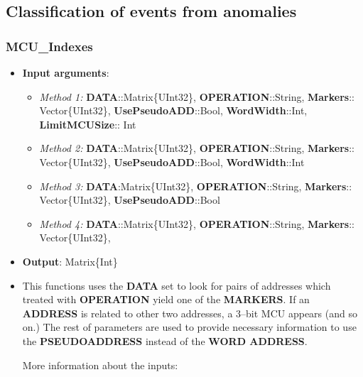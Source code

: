  \subsection{Classification of events from anomalies}\label{SubSec:ClassificationEventsFromAnomalies}
 \subsubsection*{MCU\_Indexes}
 \begin{itemize}
 	\item \textbf{Input arguments}: 
 		\begin{itemize}
 			\item \textit{Method 1: } \textbf{DATA}::Matrix\{UInt32\}, 
 			\textbf{OPERATION}::String,
 			\textbf{Markers}:: Vector\{UInt32\}, 
 			\textbf{UsePseudoADD}::Bool, 
 			\textbf{WordWidth}::Int,
 			\textbf{LimitMCUSize}:: Int
 			\item \textit{Method 2: } \textbf{DATA}::Matrix\{UInt32\}, 
 			\textbf{OPERATION}::String,
 			\textbf{Markers}:: Vector\{UInt32\}, 
 			\textbf{UsePseudoADD}::Bool, 
 			\textbf{WordWidth}::Int
 			\item \textit{Method 3: } \textbf{DATA}:Matrix\{UInt32\}, 
 			\textbf{OPERATION}::String,
 			\textbf{Markers}:: Vector\{UInt32\}, 
 			\textbf{UsePseudoADD}::Bool
 			\item \textit{Method 4: } \textbf{DATA}::Matrix\{UInt32\}, 
 			\textbf{OPERATION}::String,
 			\textbf{Markers}:: Vector\{UInt32\}, 
 		\end{itemize}
 	\item \textbf{Output}: Matrix\{Int\}
 	\item This functions uses the \textbf{DATA} set to look for pairs of addresses which treated with 	 \textbf{OPERATION} yield one of the \textbf{MARKERS}. If an \textbf{ADDRESS} is related to other two addresses, 	 a 3--bit MCU appears (and so on.) The rest of parameters are used to provide necessary  information to use the \textbf{PSEUDOADDRESS} instead of the \textbf{WORD ADDRESS}. 
	 
	 More information about the inputs:
	 

\end{itemize}
